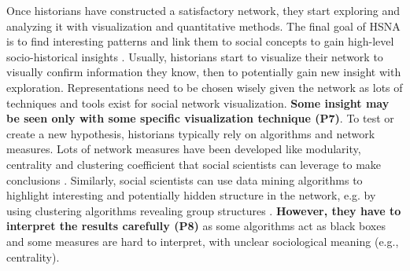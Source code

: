 Once historians have constructed a satisfactory network, they start exploring and analyzing it with visualization and quantitative methods.
The final goal of HSNA is to find interesting patterns and link them to social concepts to gain high-level socio-historical insights \cite{freeman_development_2004, wetherellHistoricalSocialNetwork1998}.
Usually, historians start to visualize their network to visually confirm information they know, then to potentially gain new insight with exploration.
Representations need to be chosen wisely given the network as lots of techniques and tools exist for social network visualization. \textbf{Some insight may be seen only with some specific visualization technique (P7)}.
To test or create a new hypothesis, historians typically rely on algorithms and network measures.
Lots of network measures have been developed like modularity, centrality and clustering coefficient that social scientists can leverage to make conclusions \cite{scottSocialNetworkAnalysis1988}.
Similarly, social scientists can use data mining algorithms to highlight interesting and potentially hidden structure in the network, e.g. by using clustering algorithms revealing group structures \cite{brandesModularityClustering2008}.
\textbf{However, they have to interpret the results carefully (P8)} as some algorithms act as black boxes and some measures are hard to interpret, with unclear sociological meaning (e.g., centrality).
